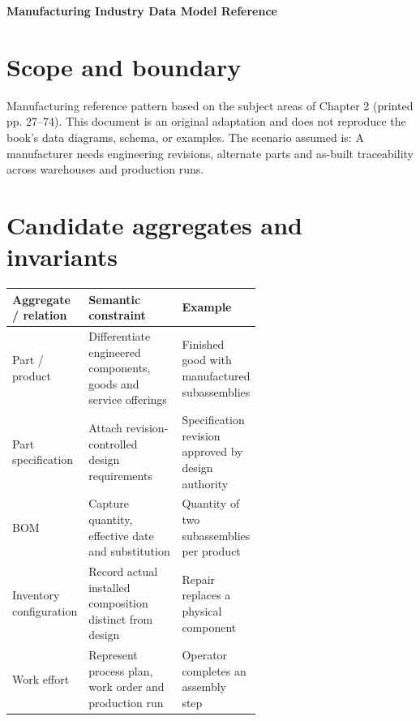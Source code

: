 \documentclass[11pt,letterpaper]{article}
\begin{document}
\begin{center}
{\LARGE\bfseries\color{navy} Manufacturing Industry Data Model Reference}\par
\vspace{0.25em}{\large Conceptual to logical reference | original adaptation}\par
{}
\end{center}
\vspace{0.8em}
\section{Scope and boundary}
Manufacturing reference pattern based on the subject areas of Chapter 2 (printed pp. 27--74). This document is an original adaptation and does not reproduce the book's data diagrams, schema, or examples. The scenario assumed is: A manufacturer needs engineering revisions, alternate parts and as-built traceability across warehouses and production runs.


\section{Candidate aggregates and invariants}
\begin{tabularx}{\linewidth}{@{}>{\raggedright\arraybackslash}p{0.23\linewidth} >{\raggedright\arraybackslash}p{0.38\linewidth}>{\raggedright\arraybackslash}X@{}}
\toprule
\textbf{Aggregate / relation} & \textbf{Semantic constraint} & \textbf{Example} \\ 
\midrule
Part / product & Differentiate engineered components, goods and service offerings & Finished good with manufactured subassemblies \\ 
Part specification & Attach revision-controlled design requirements & Specification revision approved by design authority \\ 
BOM & Capture quantity, effective date and substitution & Quantity of two subassemblies per product \\ 
Inventory configuration & Record actual installed composition distinct from design & Repair replaces a physical component \\ 
Work effort & Represent process plan, work order and production run & Operator completes an assembly step \\ 
\bottomrule
\end{tabularx}
\end{document}
